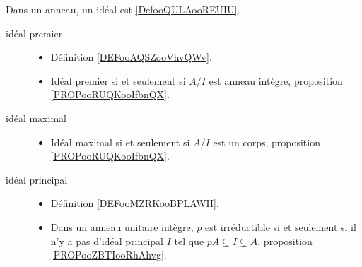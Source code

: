 Dans un anneau, un idéal est \ref{DefooQULAooREUIU}.
\begin{description}
	\item[idéal premier]\hspace{1cm}
	      \begin{itemize}
		      \item
		            Définition \ref{DEFooAQSZooVhvQWv}.
		      \item Idéal premier si et seulement si \( A/I\) est anneau intègre, proposition \ref{PROPooRUQKooIfbnQX}.
	      \end{itemize}
	\item[idéal maximal]\hspace{1cm}
	      \begin{itemize}
		      \item
		            Idéal maximal si et seulement si \( A/I\) est un corps, proposition \ref{PROPooRUQKooIfbnQX}.
	      \end{itemize}
	\item[idéal principal]\hspace{1cm}
	      \begin{itemize}
		      \item
		            Définition \ref{DEFooMZRKooBPLAWH}.
		      \item
		            Dans un anneau unitaire intègre, \( p\) est irréductible si et seulement si il n'y a pas d'idéal principal \( I\) tel que \( pA\subsetneq I\subsetneq A\), proposition \ref{PROPooZBTIooRhAhvg}.
	      \end{itemize}
\end{description}
